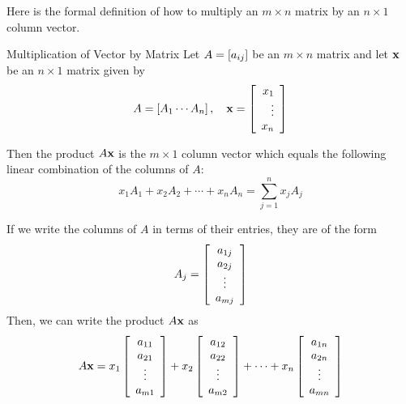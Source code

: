 Here is the formal definition of how to multiply an $m\times
n $ matrix by an $ n\times 1 $ column vector.

\begin{definition}{Multiplication of Vector by Matrix}\label{def:multiplicationvectormatrix}
Let $A=\left[ a_{ij} \right]$ be an $m\times n$ matrix and let $\mathbf{x}$
be an $n\times 1$ matrix given by 
\begin{equation*}
A=\left[ A_{1} \cdots A_{n}\right], \quad \mathbf{x} = \left[
\begin{array}{r}
x_{1} \\
\vdots \\
x_{n}
\end{array}
\right] 
\end{equation*}

Then the product $A\mathbf{x}$ is the $m\times 1$ column
vector which equals the following
linear combination of the columns of $A$:
\begin{equation*}
x_{1}A_{1}+x_{2}A_{2}+\cdots +x_{n}A_{n} = 
\sum_{j=1}^{n}x_{j}A_{j}  
\end{equation*}
\end{definition}

If we write the columns of $A$ in terms of their entries, they are of the form
\begin{equation*}
A_{j}  =
\left[
\begin{array}{c}
a_{1j} \\
a_{2j} \\
\vdots \\
a_{mj}
\end{array}
\right] 
\end{equation*}
Then, we can write the product $A\mathbf{x}$ as
\begin{equation*}
A\mathbf{x} = 
x_{1}\left[
\begin{array}{c}
a_{11} \\
a_{21} \\
\vdots \\
a_{m1}
\end{array}
\right] + x_{2}\left[
\begin{array}{c}
a_{12} \\
a_{22} \\
\vdots \\
a_{m2}
\end{array}
\right] +\cdots + x_{n}\left[
\begin{array}{c}
a_{1n} \\
a_{2n} \\
\vdots \\
a_{mn}
\end{array}
\right] 
\end{equation*}

